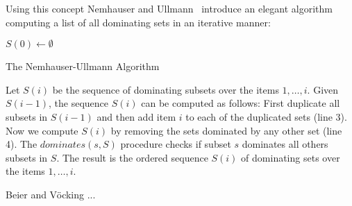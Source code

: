 \documentclass{article}
\begin{document}
Using this concept Nemhauser and Ullmann~\cite{nemhauser1969discrete} introduce an elegant
algorithm computing a list of all dominating sets in an iterative manner:

\begin{algorithm}[H]
 $S(0) \leftarrow \emptyset $\;
 \caption{The Nemhauser-Ullmann Algorithm}
\end{algorithm}

Let $S(i)$ be the sequence of dominating subsets over the items $1, \ldots, i$.
Given $S(i-1)$, the sequence $S(i)$ can be computed as follows:
First duplicate all subsets in $S(i-1)$ and then add item $i$ to each of the duplicated sets (line 3).
Now we compute $S(i)$ by removing the sets dominated by any other set (line 4).
The $dominates(s, S)$ procedure checks if subset $s$ dominates all others subsets in $S$.
The result is the ordered sequence $S(i)$ of dominating sets over the items $1, \ldots, i$.

Beier and V{\"o}cking \cite{beier2003random}...



\end{document}
